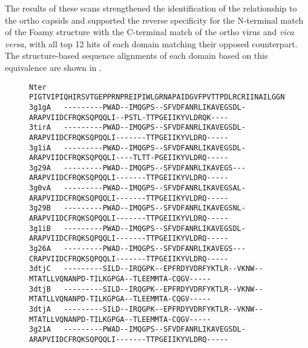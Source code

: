 The results of these scans strengthened the identification
of the relationship to the ortho capsids and supported the reverse specificity for the N-terminal
match of the Foamy structure with the C-terminal match of the ortho virus and {\em vica versa}, with all
top 12 hits of each domain matching their opposed counterpart.
The structure-based sequence alignments of each domain based on this equivalence are shown in .

\begin{figure}
\centering
\begin{singlespace}
\begin{tiny}
\begin{Verbatim}[frame=single]
Nter    PIGTVIPIQHIRSVTGEPPRNPREIPIWLGRNAPAIDGVFPVTTPDLRCRIINAILGGNIGLSLTPGDCLTWDSAVATLFIRTHGTFP
3g1gA   ---------PWAD--IMQGPS--SFVDFANRLIKAVEGSDL-ARAPVIIDCFRQKSQPQQLI--PSTL-TTPGEIIKYVLDRQK----
3tirA   ---------PWAD--IMQGPS--SFVDFANRLIKAVEGSDL-ARAPVIIDCFRQKSQPQQLI-------TTPGEIIKYVLDRQ-----
3g1iA   ---------PWAD--IMQGPS--SFVDFANRLIKAVEGSDL-ARAPVIIDCFRQKSQPQQLI----TLTT-PGEIIKYVLDRQ-----
3g29A   ---------PWAD--IMQGPS--SFVDFANRLIKAVEGS---ARAPVIIDCFRQKSQPQQLI-------TTPGEIIKYVLDRQ-----
3g0vA   ---------PWAD--IMQGPS--SFVDFANRLIKAVEGSAL-ARAPVIIDCFRQKSQPQQLI-------TTPGEIIKYVLDRQ-----
3g29B   ---------PWAD--IMQGPS--SFVDFANRLIKAVEGSNL-ARAPVIIDCFRQKSQPQQLI-------TTPGEIIKYVLDRQ-----
3g1iB   ---------PWAD--IMQGPS--SFVDFANRLIKAVEGSDL-ARAPVIIDCFRQKSQPQQLI-------TTPGEIIKYVLDRQ-----
3g26A   ---------PWAD--IMQGPS--SFVDFANRLIKAVEGS---CRAPVIIDCFRQKSQPQQLI-------TTPGEIIKYVLDRQ-----
3dtjC   ---------SILD--IRQGPK--EPFRDYVDRFYKTLR--VKNW--MTATLLVQNANPD-TILKGPGA--TLEEMMTA-CQGV-----
3dtjB   ---------SILD--IRQGPK--EPFRDYVDRFYKTLR--VKNW--MTATLLVQNANPD-TILKGPGA--TLEEMMTA-CQGV-----
3dtjA   ---------SILD--IRQGPK--EPFRDYVDRFYKTLR--VKNW--MTATLLVQNANPD-TILKGPGA--TLEEMMTA-CQGV-----
3g21A   ---------PWAD--IMQGPS--SFVDFANRLIKAVEGSDL-ARAPVIIDCFRQKSQPQQLI-------TTPGEIIKYVLDRQ-----


\end{Verbatim}
\end{tiny}
\end{singlespace}
\end{figure}
